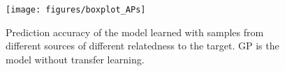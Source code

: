 \begin{figure}[t]
	\begin{center}
		\texttt{[image: figures/boxplot\_APs]}
				\caption{Prediction accuracy of the model learned with samples from different sources of different relatedness to the target. GP is the model without transfer learning.}
				\label{fig:sensitivity_corr_boxplot}
	\end{center}
\end{figure}






